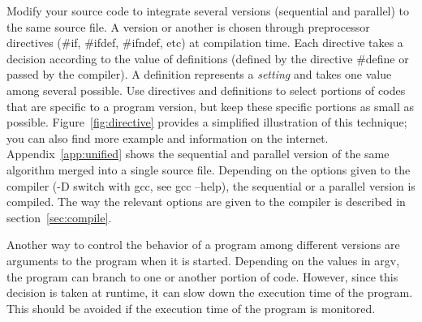 Modify your source code to integrate several versions (sequential and parallel) to the same source file. A version or another is chosen through preprocessor directives (\#if, \#ifdef, \#ifndef, etc) at compilation time. Each directive takes a decision according to the value of definitions (defined by the directive \#define or passed by the compiler). A definition represents a \emph{setting} and takes one value among several possible. Use directives and definitions to select portions of codes that are specific to a program version, but keep these specific portions as small as possible. Figure~\ref{fig:directive} provides a simplified illustration of this technique; you can also find more example and information on the internet. Appendix~\ref{app:unified} shows the sequential and parallel version of the same algorithm merged into a single source file. Depending on the options given to the compiler (-D switch with gcc, see gcc --help), the sequential or a parallel version is compiled. The way the relevant options are given to the compiler is described in section~\ref{sec:compile}.

Another way to control the behavior of a program among different versions are arguments to the program when it is started. Depending on the values in argv, the program can branch to one or another portion of code. However, since this decision is taken at runtime, it can slow down the execution time of the program. This should be avoided if the execution time of the program is monitored.

